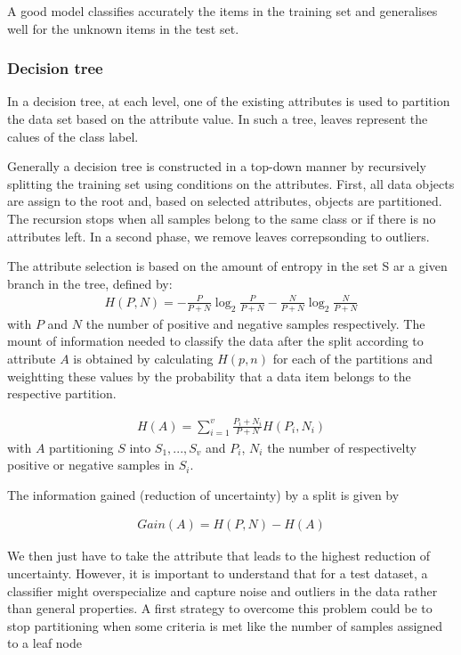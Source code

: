 A good model classifies accurately the items in the training set and generalises well for the unknown items in the test set.

\subsubsection*{Decision tree}
In a decision tree, at each level, one of the existing attributes is used to partition the data set based on the attribute value. In such a tree, leaves represent the calues of the class label.

Generally a decision tree is constructed in a top-down manner by recursively splitting the training set using conditions on the attributes. First, all data objects are assign to the root and, based on selected attributes, objects are partitioned. The recursion stops when all samples belong to the same class or if there is no attributes left. In a second phase, we remove leaves correpsonding to outliers.

The attribute selection is based on the amount of entropy in the set S ar a given branch in the tree, defined by:
\begin{align*}
	H(P, N) = - \frac{P}{P + N} \log_2 \frac{P}{P + N} - \frac{N}{P + N} \log_2 \frac{N}{P + N} 
\end{align*}
with $P$ and $N$ the number of positive and negative samples respectively. The mount of information needed to classify the data after the split according to attribute $A$ is obtained by calculating $H(p,n)$ for each of the partitions and weightting these values by the probability that a data item belongs to the respective partition.

\begin{align*}
	H(A) = \sum_{i = 1}^v \frac{P_i + N_i}{P + N} H(P_i, N_i)
\end{align*}
with $A$ partitioning $S$ into $S_1, ..., S_v$ and $P_i$, $N_i$ the number of respectivelty positive or negative samples in $S_i$.

The information gained (reduction of uncertainty) by a split is given by

\begin{align*}
	Gain(A) = H(P, N) - H(A)
\end{align*}

We then just have to take the attribute that leads to the highest reduction of uncertainty. However, it is important to understand that for a test dataset, a classifier might overspecialize and capture noise and outliers in the data rather than general properties. A first strategy to overcome this problem could be to stop partitioning when some criteria is met like the number of samples assigned to a leaf node

